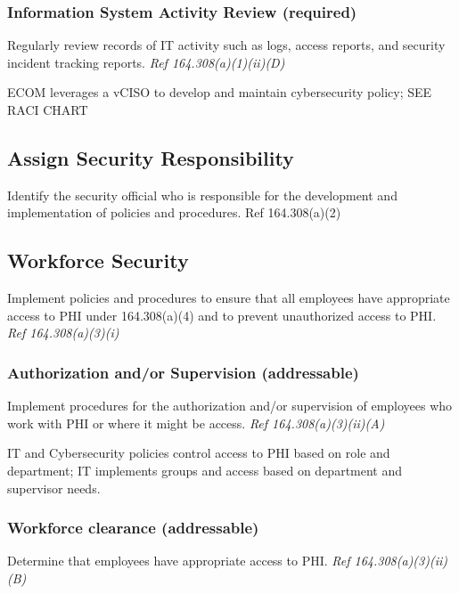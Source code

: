 \documentclass[../main.tex]{subfiles}
\begin{document}
        \subsubsection{Information System Activity Review (required)}
            Regularly review records of IT activity such as logs, access reports, and security incident tracking reports. \emph{Ref 164.308(a)(1)(ii)(D)}\cite{us}

            \vspace{3mm}

            \noindent ECOM leverages a vCISO to develop and maintain cybersecurity policy; SEE RACI CHART

    \subsection{Assign Security Responsibility}
        Identify the security official who is responsible for the development and implementation of policies and procedures. Ref 164.308(a)(2)\cite{us}

    \subsection{Workforce Security}
        Implement policies and procedures to ensure that all employees have appropriate access to PHI under 164.308(a)(4) and to prevent unauthorized access to PHI. \emph{Ref 164.308(a)(3)(i)}\cite{us}
        \subsubsection{Authorization and/or Supervision (addressable)}
            Implement procedures for the authorization and/or supervision of employees who work with PHI or where it might be access. \emph{Ref 164.308(a)(3)(ii)(A)}\cite{us}

            \vspace{3mm}

            \noindent IT and Cybersecurity policies control access to PHI based on role and department; IT implements groups and access based on department and supervisor needs.

        \subsubsection{Workforce clearance (addressable)}
            Determine that employees have appropriate access to PHI. \emph{Ref 164.308(a)(3)(ii)(B)}\cite{us}
\end{document}
